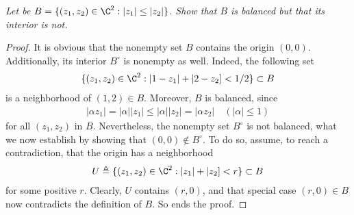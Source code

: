 \textit{Let be %
%
  $B = \{(z_{1}, z_{2}) \in \C^2: |z_{1}| \leq |z_{2}| \}$. %
%
Show that $B$ is balanced but that its interior is not.
}
%
\begin{proof}
It is obvious that the nonempty set $B$ contains the origin $(0,0)$. %
Additionally, its interior $B^\circ$ is nonempty as well. %
Indeed, the following set %
%
\begin{align}
  \{(z_1, z_2) \in \C^2: |1- z_1| + |2- z_2] < 1/2 \} \subset B %
\end{align}
%
is a neighborhood of $(1, 2) \in B$. %
Moreover, $B$ is balanced, since
\begin{align}
  |\alpha z_1|  = |\alpha| |z_1| \leq  |\alpha| |z_2| = |\alpha z_2| %
  \quad (|\alpha| \leq 1)
\end{align}
%
for all $(z_1, z_2)$ in $B$. %
%
Nevertheless, the nonempty set $B^\circ$ is not balanced, what we now %
establish by showing that $(0, 0) \notin B^\circ$. %
%
To do so, assume, to reach a contradiction, %
that the origin has a neighborhood %
%
\begin{align}
  U \triangleq \{(z_1, z_2) \in \C^2: |z_1| + |z_2] < r \} \subset B %
\end{align}
%
for some positive $r$. Clearly, $U$ contains $(r, 0)$,  %
and that special case $(r, 0) \in B$ now contradicts the definition of $B$. %
So ends the proof.
\end{proof}
